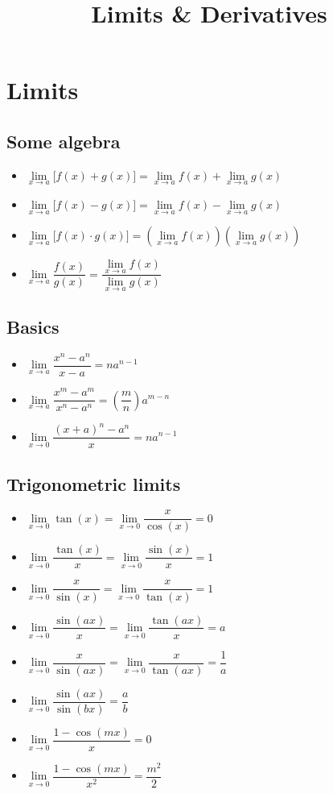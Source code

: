 \documentclass{article}
\title{Limits \& Derivatives}
\begin{document}
\maketitle
\section{Limits}
\subsection{Some algebra}
\begin{itemize}
  \item $\lim\limits_{x \to a}\bigl[f(x) + g(x)\bigr] =
  \lim\limits_{x \to a}f(x) + \lim\limits_{x \to a}g(x)$
  \item $\lim\limits_{x \to a}\bigl[f(x) - g(x)\bigr] =
  \lim\limits_{x \to a}f(x) - \lim\limits_{x \to a}g(x)$
  \item $\lim\limits_{x \to a}\bigl[f(x) \cdot g(x)\bigr] =
  \left(\lim\limits_{x \to a}f(x)\right)\left(\lim\limits_{x \to a}g(x)\right)$
  \item $\lim\limits_{x \to a}\dfrac{f(x)}{g(x)} =
  \dfrac{\lim\limits_{x \to a}f(x)}{\lim\limits_{x \to a}g(x)}$
\end{itemize}

\subsection{Basics}
\begin{itemize} 
  \item $\lim\limits_{x \to a}\dfrac{x^n - a^n}{x - a} = na^{n-1}$
  \item $\lim\limits_{x \to a}\dfrac{x^m - a^m}{x^n - a^n} = \left(\dfrac{m}{n}\right)a^{m-n}$
  \item $\lim\limits_{x \to 0}\dfrac{{(x+a)}^{n} - a^n}{x} = na^{n-1}$
\end{itemize} 

\subsection{Trigonometric limits}
\begin{itemize}
  \item $\lim\limits_{x \to 0}\tan(x) =
  \lim\limits_{x \to 0}\dfrac{x}{\cos(x)} = 0$
  \item $\lim\limits_{x \to 0}\dfrac{\tan(x)}{x} =
  \lim\limits_{x \to 0}\dfrac{\sin(x)}{x} = 1$
  \item $\lim\limits_{x \to 0}\dfrac{x}{\sin(x)} = 
  \lim\limits_{x \to 0}\dfrac{x}{\tan(x)} = 1$
  \item $\lim\limits_{x \to 0}\dfrac{\sin(ax)}{x} =
  \lim\limits_{x \to 0}\dfrac{\tan(ax)}{x} = a$
  \item $\lim\limits_{x \to 0}\dfrac{x}{\sin(ax)} =
  \lim\limits_{x \to 0}\dfrac{x}{\tan(ax)} = \dfrac{1}{a}$
  \item $\lim\limits_{x \to 0}\dfrac{\sin(ax)}{\sin(bx)} = \dfrac{a}{b}$
  \item $\lim\limits_{x \to 0}\dfrac{1 - \cos(mx)}{x} = 0$
  \item $\lim\limits_{x \to 0}\dfrac{1 - \cos(mx)}{x^2} = \dfrac{m^2}{2}$
\end{itemize}
\end{document}
